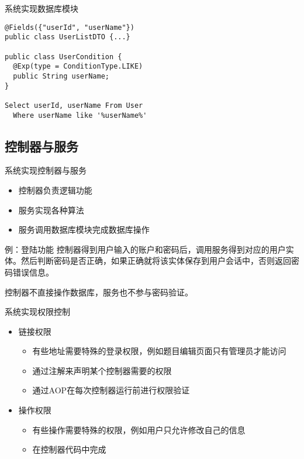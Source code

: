 \documentclass{beamer}
\begin{document}
\begin{frame}[containsverbatim]{系统实现}{数据库模块}
\begin{verbatim}
@Fields({"userId", "userName"})
public class UserListDTO {...}

public class UserCondition {
  @Exp(type = ConditionType.LIKE)
  public String userName;
}

Select userId, userName From User 
  Where userName like '%userName%'
\end{verbatim}
\end{frame}

\subsection{控制器与服务}
\begin{frame}{系统实现}{控制器与服务}
\begin{itemize}
	\item 控制器负责逻辑功能
	\item 服务实现各种算法
	\item 服务调用数据库模块完成数据库操作
\end{itemize}
\pause
\begin{exampleblock}{例：登陆功能}
控制器得到用户输入的账户和密码后，调用服务得到对应的用户实体。然后判断密码是否正确，如果正确就将该实体保存到用户会话中，否则返回密码错误信息。

控制器不直接操作数据库，服务也不参与密码验证。
\end{exampleblock}
\end{frame}

\begin{frame}{系统实现}{权限控制}
\begin{itemize}
	\item 链接权限
	\begin{itemize}
		\item 有些地址需要特殊的登录权限，例如题目编辑页面只有管理员才能访问
		\item 通过注解来声明某个控制器需要的权限
		\item 通过AOP在每次控制器运行前进行权限验证
	\end{itemize}
	\item 操作权限
	\begin{itemize}
		\item 有些操作需要特殊的权限，例如用户只允许修改自己的信息
		\item 在控制器代码中完成
	\end{itemize}
\end{itemize}
\end{frame}
\end{document}
